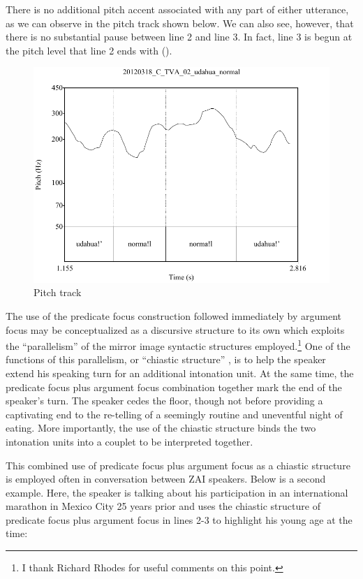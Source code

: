 There is no additional pitch accent associated with any part of either utterance, as we can observe in the pitch track shown below. We can also see, however, that there is no substantial pause between line 2 and line 3. In fact, line 3 is begun at the pitch level that line 2 ends with ().

 \begin{figure} 
\caption{Pitch track}
\label{fig:5:gudahuanormal}
 
\includegraphics[height=.4\textheight]{gudahuanormal}
 \end{figure}


The use of the predicate focus construction followed immediately by argument focus may be conceptualized as a discursive structure to its own which exploits the ``parallelism'' \citep{jakobson1966,fox1977} of the mirror image syntactic structures employed.\footnote{I thank Richard Rhodes for useful comments on this point.} One of the functions of this parallelism, or ``chiastic structure'' \citep{silverstein1984}, is to help the speaker extend his speaking turn for an additional intonation unit. At the same time, the predicate focus plus argument focus combination together mark the end of the speaker's turn. The speaker cedes the floor, though not before providing a captivating end to the re-telling of a seemingly routine and uneventful night of eating. More importantly, the use of the chiastic structure binds the two intonation units into a couplet to be interpreted together.

This combined use of predicate focus plus argument focus as a chiastic structure is employed often in conversation between ZAI speakers. Below is a second example. Here, the speaker is talking about his participation in an international marathon in Mexico City 25 years prior and uses the chiastic structure of predicate focus plus argument focus in lines 2-3 to highlight his young age at the time:

